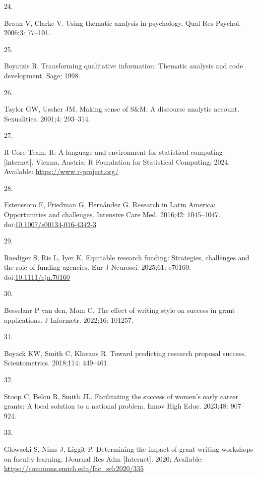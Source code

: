 \documentclass[
  letterpaper,
  DIV=11,
  numbers=noendperiod]{scrartcl}
\newlength{\cslhangindent}
\newlength{\csllabelwidth}
\newenvironment{CSLReferences}[2] %
 {\begin{list}{}{%
  \setlength{\itemindent}{0pt}
  \setlength{\leftmargin}{0pt}
  \setlength{\parsep}{0pt}
  \ifodd #1
   \setlength{\leftmargin}{\cslhangindent}
   \setlength{\itemindent}{-1\cslhangindent}
  \fi
  \setlength{\itemsep}{#2\baselineskip}}}
 {\end{list}}
\newcommand{\CSLLeftMargin}[1]{\parbox[t]{\csllabelwidth}{\strut#1\strut}}
\newcommand{\CSLRightInline}[1]{\parbox[t]{\linewidth - \csllabelwidth}{\strut#1\strut}}
\begin{document}
\begin{CSLReferences}{0}{1}
\CSLLeftMargin{24. }%
\CSLRightInline{Braun V, Clarke V. Using thematic analysis in
psychology. Qual Res Psychol. 2006;3: 77--101. }

\CSLLeftMargin{25. }%
\CSLRightInline{Boyatzis R. Transforming qualitative information:
Thematic analysis and code development. Sage; 1998. }

\CSLLeftMargin{26. }%
\CSLRightInline{Taylor GW, Ussher JM. Making sense of {S\&M}: A
discourse analytic account. Sexualities. 2001;4: 293--314. }

\CSLLeftMargin{27. }%
\CSLRightInline{R Core Team. R: A language and environment for
statistical computing {[}internet{]}. Vienna, Austria: R Foundation for
Statistical Computing; 2024; Available:
\url{https://www.r-project.org/}}

\CSLLeftMargin{28. }%
\CSLRightInline{Estenssoro E, Friedman G, Hernández G. Research in
{Latin America}: Opportunities and challenges. Intensive Care Med.
2016;42: 1045--1047.
doi:\href{https://doi.org/10.1007/s00134-016-4342-3}{10.1007/s00134-016-4342-3}}

\CSLLeftMargin{29. }%
\CSLRightInline{Ruediger S, Ris L, Iyer K. Equitable research funding:
Strategies, challenges and the role of funding agencies. Eur J Neurosci.
2025;61: e70160.
doi:\href{https://doi.org/10.1111/ejn.70160}{10.1111/ejn.70160}}

\CSLLeftMargin{30. }%
\CSLRightInline{Besselaar P van den, Mom C. The effect of writing style
on success in grant applications. J Informetr. 2022;16: 101257. }

\CSLLeftMargin{31. }%
\CSLRightInline{Boyack KW, Smith C, Klavans R. Toward predicting
research proposal success. Scientometrics. 2018;114: 449--461. }

\CSLLeftMargin{32. }%
\CSLRightInline{Stoop C, Belou R, Smith JL. Facilitating the success of
women's early career grants: A local solution to a national problem.
Innov High Educ. 2023;48: 907--924. }

\CSLLeftMargin{33. }%
\CSLRightInline{Glowacki S, Nims J, Liggit P. Determining the impact of
grant writing workshops on faculty learning. IJournal Res Adm
{[}Internet{]}. 2020; Available:
\url{https://commons.emich.edu/fac_sch2020/335}}


\end{CSLReferences}
\end{document}
